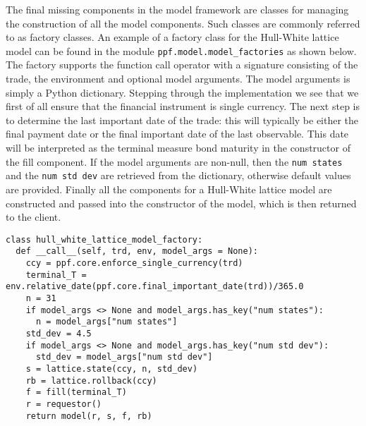The final missing components in the model framework are classes for
managing the construction of all the model components. Such classes
are commonly referred to as factory classes. An example of a factory
class for the Hull-White lattice model can be found in the module
\verb|ppf.model.model_factories| as shown below. The factory supports
the function call operator with a signature consisting of the trade,
the environment and optional model arguments. The model arguments is
simply a Python dictionary. Stepping through the implementation we see
that we first of all ensure that the financial instrument is single
currency. The next step is to determine the last important date of the
trade: this will typically be either the final payment date or the
final important date of the last observable. This date will
be interpreted as the terminal measure bond maturity in the
constructor of the fill component. If the model arguments are
non-null, then the \verb|num states| and the \verb|num std dev| are
retrieved from the dictionary, otherwise default values are
provided. Finally all the components for a Hull-White lattice model
are constructed and passed into the constructor of the model, which is
then returned to the client.
\begin{verbatim}
class hull_white_lattice_model_factory:
  def __call__(self, trd, env, model_args = None):
    ccy = ppf.core.enforce_single_currency(trd)
    terminal_T = env.relative_date(ppf.core.final_important_date(trd))/365.0
    n = 31
    if model_args <> None and model_args.has_key("num states"):
      n = model_args["num states"]
    std_dev = 4.5
    if model_args <> None and model_args.has_key("num std dev"):
      std_dev = model_args["num std dev"]
    s = lattice.state(ccy, n, std_dev)
    rb = lattice.rollback(ccy)
    f = fill(terminal_T)
    r = requestor()
    return model(r, s, f, rb)
\end{verbatim}

